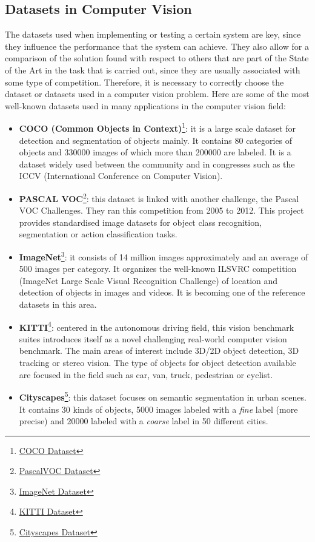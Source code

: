 \documentclass{bmvc2k}
\begin{document}
\subsection{Datasets in Computer Vision}
The datasets used when implementing or testing a certain system are key, since they influence the performance that the system can achieve. They also allow for a comparison of the solution found with respect to others that are part of the State of the Art in the task that is carried out, since they are usually associated with some type of competition. Therefore, it is necessary to correctly choose the dataset or datasets used in a computer vision problem. Here are some of the most well-known datasets used in many applications in the computer vision field:
\begin{itemize}
\item \textbf{COCO (Common Objects in Context)}\footnote {\href{http://cocodataset.org/#home}{COCO Dataset}}: it is a large scale dataset for detection and segmentation of objects mainly. It contains 80 categories of objects and 330000 images of which more than 200000 are labeled. It is a dataset widely used between the community and in congresses such as the ICCV (International Conference on Computer Vision).
\item \textbf{PASCAL VOC}\footnote {\href{http://host.robots.ox.ac.uk/pascal/VOC/}{PascalVOC Dataset}}: this dataset is linked with another challenge, the Pascal VOC Challenges. They ran this competition from 2005 to 2012. This project provides standardised image datasets for object class recognition, segmentation or action classification tasks.
\item \textbf{ImageNet}\footnote {\href{http://www.image-net.org/}{ImageNet Dataset}}: it consists of 14 million images approximately and an average of 500 images per category. It organizes the well-known ILSVRC competition (ImageNet Large Scale Visual Recognition Challenge) of location and detection of objects in images and videos. It is becoming one of the reference datasets in this area.
\item \textbf{KITTI}\footnote {\href{http://www.cvlibs.net/datasets/kitti/}{KITTI Dataset}}: centered in the autonomous driving field, this vision benchmark suites introduces itself as a novel challenging real-world computer vision benchmark. The main areas of interest include 3D/2D object detection, 3D tracking or stereo vision. The type of objects for object detection available are focused in the field such as car, van, truck, pedestrian or cyclist.
\item \textbf{Cityscapes}\footnote {\href{https://www.cityscapes-dataset.com/}{Cityscapes Dataset}}: this dataset focuses on semantic segmentation in urban scenes. It contains 30 kinds of objects, 5000 images labeled with a \textit{fine} label (more precise) and 20000 labeled with a \textit{coarse} label in 50 different cities.

\end{itemize}
\end{document}
